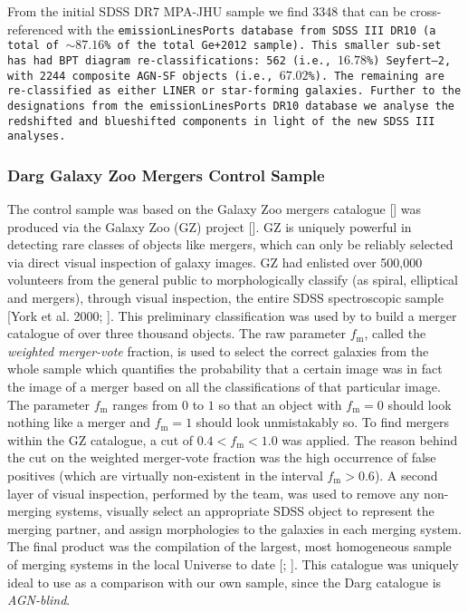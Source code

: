 From the initial SDSS DR7 MPA-JHU sample we find 3348 that can be cross-referenced with the \tt{emissionLinesPorts} database from SDSS III DR10 (a total of $\sim{87.16}$\% of the total Ge+2012 sample). This smaller sub-set has had BPT diagram re-classifications: 562 (i.e., $16.78$\%) Seyfert--2, with 2244 composite AGN-SF objects (i.e., $67.02$\%). The remaining are re-classified as either LINER or star-forming galaxies. Further to the designations from the \tt{emissionLinesPorts} DR10 database we analyse the redshifted and blueshifted components in light of the new SDSS III analyses.

\subsubsection{Darg Galaxy Zoo Mergers Control Sample}

The control sample was based on the Galaxy Zoo mergers catalogue [\cite{2010MNRAS.401.1552D}] was produced via the Galaxy Zoo (GZ) project [\cite{2008MNRAS.389.1179L}]. GZ is uniquely powerful in detecting rare classes of objects like mergers, which can only be reliably selected via direct visual inspection of galaxy images. GZ had enlisted over 500,000 volunteers from the general public to morphologically classify (as spiral, elliptical and mergers), through visual inspection, the entire SDSS spectroscopic sample [York et al. 2000; \cite{2008ApJS..175..297A}]. This preliminary classification was used by \cite{2010MNRAS.401.1043D} to build a merger catalogue of over three thousand objects. The raw parameter $f_{\text{m}}$, called the \textit{weighted merger-vote} fraction, is used to select the correct galaxies from the whole sample which quantifies the probability that a certain image was in fact the image of a merger based on all the classifications of that particular image. The parameter $f_{\text{m}}$ ranges from $0$ to $1$ so that an object with $f_{\text{m}}=0$ should look nothing like a merger and $f_{\text{m}}=1$ should look unmistakably so. To find mergers within the GZ catalogue, a cut of ${0.4}<{f_{\text{m}}}<{1.0}$ was applied. The reason behind the cut on the weighted merger-vote fraction was the high occurrence of false positives (which are virtually non-existent in the interval $f_{\text{m}}>{0.6}$). A second layer of visual inspection, performed by the team, was used to remove any non-merging systems, visually select an appropriate SDSS object to represent the merging partner, and assign morphologies to the galaxies in each merging system. The final product was the compilation of the largest, most homogeneous sample of merging systems in the local Universe to date [\cite{2010MNRAS.401.1552D}; \cite{2010MNRAS.401.1043D}]. This catalogue was uniquely ideal to use as a comparison with our own sample, since the Darg catalogue is \textit{AGN-blind}.
